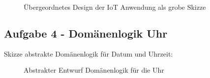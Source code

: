 \documentclass[11pt,ngerman]{article}
\begin{document}
    \begin{figure}[H]
        \centering
        \caption{Übergeordnetes Design der IoT Anwendung als grobe Skizze}
        \label{fig:DesignSkizze_Aufg3}
    \end{figure}

    \newpage
    \subsection{Aufgabe 4 - Domänenlogik Uhr}
    \label{ssec:Aufg4}
    Skizze abstrakte Domänenlogik für Datum und Uhrzeit:

    \begin{figure}[H]
        \centering
        \caption{Abstrakter Entwurf Domänenlogik für die Uhr}
        \label{fig:KD_Aufg4}
    \end{figure}
\end{document}

